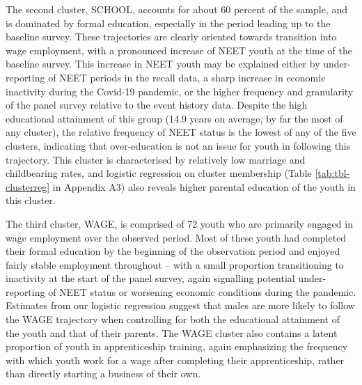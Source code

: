 \documentclass[
  a4paper, twoside, 12pt]{book}
\begin{document}
The second cluster, SCHOOL, accounts for about 60 percent of the sample, and is dominated by formal education, especially in the period leading up to the baseline survey. These trajectories are clearly oriented towards transition into wage employment, with a pronounced increase of NEET youth at the time of the baseline survey. This increase in NEET youth may be explained either by under-reporting of NEET periods in the recall data, a sharp increase in economic inactivity during the Covid-19 pandemic, or the higher frequency and granularity of the panel survey relative to the event history data. Despite the high educational attainment of this group (14.9 years on average, by far the most of any cluster), the relative frequency of NEET status is the lowest of any of the five clusters, indicating that over-education is not an issue for youth in following this trajectory. This cluster is characterised by relatively low marriage and childbearing rates, and logistic regression on cluster membership (Table \ref{tab:tbl-clusterreg} in Appendix A3) also reveals higher parental education of the youth in this cluster.

The third cluster, WAGE, is comprised of 72 youth who are primarily engaged in wage employment over the observed period. Most of these youth had completed their formal education by the beginning of the observation period and enjoyed fairly stable employment throughout -- with a small proportion transitioning to inactivity at the start of the panel survey, again signalling potential under-reporting of NEET status or worsening economic conditions during the pandemic. Estimates from our logistic regression suggest that males are more likely to follow the WAGE trajectory when controlling for both the educational attainment of the youth and that of their parents. The WAGE cluster also contains a latent proportion of youth in apprenticeship training, again emphasizing the frequency with which youth work for a wage after completing their apprenticeship, rather than directly starting a business of their own.
\end{document}

